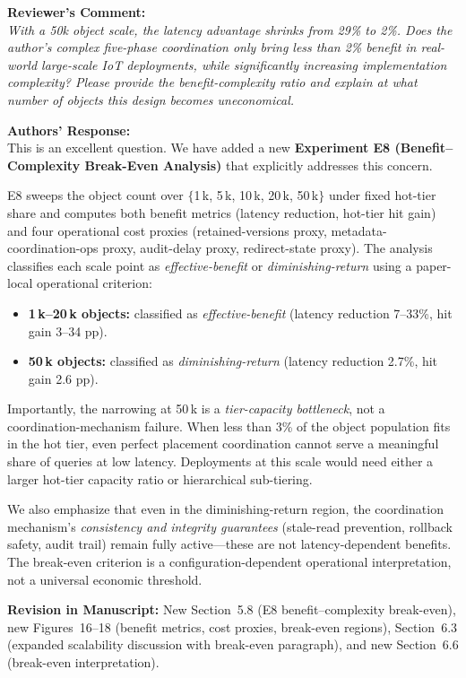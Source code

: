\documentclass[11pt,a4paper]{article}
\newcommand{\reviewercomment}[1]{%
  \vspace{6pt}\noindent\textbf{\textcolor{reviewercolor}{Reviewer's Comment:}}\\
  \textcolor{reviewercolor}{\itshape #1}\vspace{4pt}}
\newcommand{\response}[1]{%
  \noindent\textbf{\textcolor{responsecolor}{Authors' Response:}}\\
  #1\vspace{8pt}}
\newcommand{\revision}[1]{%
  \noindent\textbf{Revision in Manuscript:} #1\vspace{4pt}}
\begin{document}
\reviewercomment{With a 50k object scale, the latency advantage shrinks from 29\% to 2\%. Does the author's complex five-phase coordination only bring less than 2\% benefit in real-world large-scale IoT deployments, while significantly increasing implementation complexity? Please provide the benefit-complexity ratio and explain at what number of objects this design becomes uneconomical.}

\response{This is an excellent question. We have added a new \textbf{Experiment E8 (Benefit--Complexity Break-Even Analysis)} that explicitly addresses this concern.

E8 sweeps the object count over $\{$1\,k, 5\,k, 10\,k, 20\,k, 50\,k$\}$ under fixed hot-tier share and computes both benefit metrics (latency reduction, hot-tier hit gain) and four operational cost proxies (retained-versions proxy, metadata-coordination-ops proxy, audit-delay proxy, redirect-state proxy). The analysis classifies each scale point as \emph{effective-benefit} or \emph{diminishing-return} using a paper-local operational criterion:

\begin{itemize}[nosep]
\item \textbf{1\,k--20\,k objects:} classified as \emph{effective-benefit} (latency reduction 7--33\%, hit gain 3--34 pp).
\item \textbf{50\,k objects:} classified as \emph{diminishing-return} (latency reduction 2.7\%, hit gain 2.6 pp).
\end{itemize}

Importantly, the narrowing at 50\,k is a \emph{tier-capacity bottleneck}, not a coordination-mechanism failure. When less than 3\% of the object population fits in the hot tier, even perfect placement coordination cannot serve a meaningful share of queries at low latency. Deployments at this scale would need either a larger hot-tier capacity ratio or hierarchical sub-tiering.

We also emphasize that even in the diminishing-return region, the coordination mechanism's \emph{consistency and integrity guarantees} (stale-read prevention, rollback safety, audit trail) remain fully active---these are not latency-dependent benefits. The break-even criterion is a configuration-dependent operational interpretation, not a universal economic threshold.}

\revision{New Section~5.8 (E8 benefit--complexity break-even), new Figures~16--18 (benefit metrics, cost proxies, break-even regions), Section~6.3 (expanded scalability discussion with break-even paragraph), and new Section~6.6 (break-even interpretation).}
\end{document}
